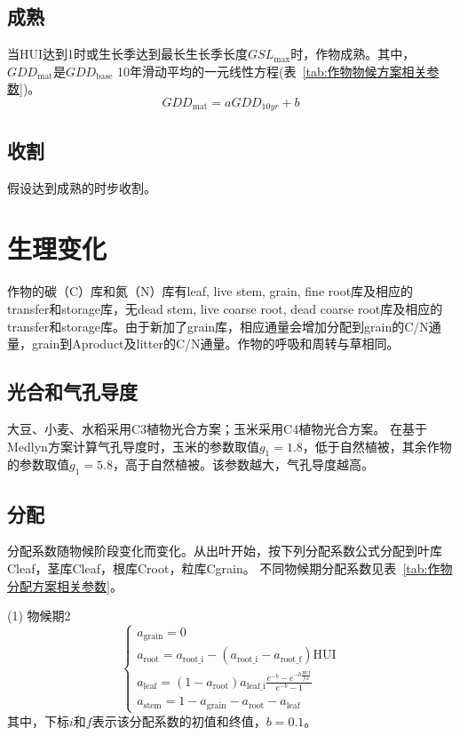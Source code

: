 \subsection{成熟}
  当${\mathrm {HUI}}$达到1时或生长季达到最长生长季长度$GSL_{\mathrm{max}}$时，作物成熟。其中，$GDD_{\mathrm{mat}}$是$GDD_{\mathrm{base}}$
  10年滑动平均的一元线性方程(表~\ref{tab:作物物候方案相关参数})。
  \begin{equation}
    GDD_{\mathrm{mat}}=a GDD_{10yr}+b
  \end{equation}

\subsection{收割}
  假设达到成熟的时步收割。


\section{生理变化}
作物的碳（C）库和氮（N）库有leaf, live stem, grain, fine root库及相应的transfer和storage库，无dead stem, live coarse root, dead coarse root库及相应的transfer和storage库。由于新加了grain库，相应通量会增加分配到grain的C/N通量，grain到Aproduct及litter的C/N通量。作物的呼吸和周转与草相同。

\subsection{光合和气孔导度}
大豆、小麦、水稻采用C3植物光合方案；玉米采用C4植物光合方案。
在基于Medlyn方案计算气孔导度时，玉米的参数取值$g_1=1.8$，低于自然植被，其余作物的参数取值$g_1=5.8$，高于自然植被。该参数越大，气孔导度越高。

\subsection{分配}
分配系数随物候阶段变化而变化。从出叶开始，按下列分配系数公式分配到叶库Cleaf，茎库Cleaf，根库Croot，粒库Cgrain。
不同物候期分配系数见表~\ref{tab:作物分配方案相关参数}。

(1)	物候期2 \\
\begin{equation}
\left\{\begin{array}{c}
  a_{\mathrm{grain}}=0 \\
  a_{\mathrm{root}}=a_{\mathrm{root\_i}}-\left(a_{\mathrm{root\_i}}-a_{\mathrm{root\_f}}\right) {\mathrm {HUI}} \\
  a_{\mathrm{leaf}}=\left(1-a_{\mathrm{root}}\right) a_{\mathrm{leaf\_i}} \frac{{e}^{-{b}}-{e}^{-b \frac{{\mathrm {HUI}}}{f_{\mathrm{GF}}}}}{{e}^{-{b}}-1}   \\
  a_{\mathrm{stem}}=1-a_{\mathrm{grain}}-a_{\mathrm{root}}-a_{\mathrm{leaf}}
  \end{array}\right.
\end{equation}
其中，下标$i$和$f$表示该分配系数的初值和终值，$b=0.1$。

